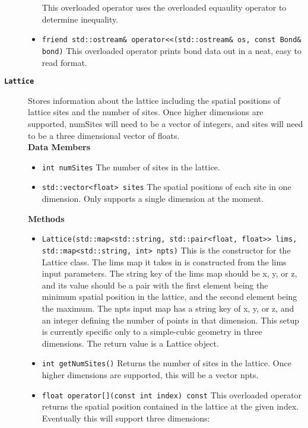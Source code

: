 \begin{description}
\begin{itemize}
        This overloaded operator uses the overloaded equaulity operator to 
        determine inequality.
      \item \texttt{friend std::ostream\& operator<<(std::ostream\& os, const Bond\& bond)}
        This overloaded operator prints bond data out in a neat, easy to read 
        format.
    \end{itemize}
  \item[\texttt{\textbf{Lattice}}]
    Stores information about the lattice including the spatial positions of 
    lattice sites and the number of sites.
    Once higher dimensions are supported, numSites will need to be a vector of
    integers, and sites will need to be a three dimensional vector of floats. \\
    \textbf{Data Members}
    \begin{itemize}
      \item \texttt{int numSites}
        The number of sites in the lattice.
      \item \texttt{std::vector<float> sites}
        The spatial positions of each site in one dimension. 
        Only supports a single dimension at the moment.
    \end{itemize}
    \textbf{Methods}
    \begin{itemize}
      \item \texttt{Lattice(std::map<std::string, std::pair<float, float>> lims, std::map<std::string, int> npts)}
        This is the constructor for the Lattice class. 
        The lims map it takes in is constructed from the lims input parameters.
        The string key of the lims map should be x, y, or z, and its value 
        should be a pair with the first element being the minimum spatial 
        position in the lattice, and the second element being the maximum.
        The npts input map has a string key of x, y, or z, and an integer 
        defining the number of points in that dimension.
        This setup is currently specific only to a simple-cubic geometry in
        three dimensions. 
        The return value is a Lattice object.
      \item \texttt{int getNumSites()}
        Returns the number of sites in the lattice. 
        Once higher dimensions are supported, this will be a vector npts.
      \item \texttt{float operator[](const int index) const}
        This overloaded operator returns the spatial position contained in the
        lattice at the given index. 
        Eventually this will support three dimensions:

\end{itemize}
\end{description}
